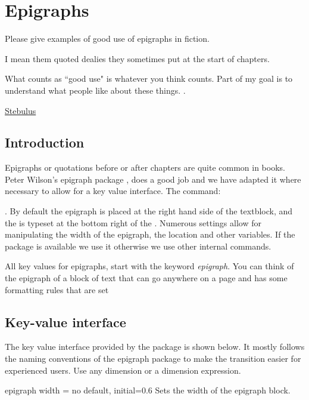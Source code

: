 

\chapter{Epigraphs}
\label{c:epigraphs}

\epigraph{Please give examples of good use of epigraphs in fiction.

I mean them quoted dealies they sometimes put at the start of chapters.

What counts as ``good use" is whatever you think counts. Part of my goal is to understand what people like about these things.
.}{\href{http://ask.metafilter.com/207423/Good-use-of-epigraphs-in-fiction}{Stebulus}}



\section{Introduction}

Epigraphs or quotations before or after chapters are quite common in books. Peter Wilson's epigraph package \citep{epigraph}, 
does a good job and we have adapted it where necessary to allow for a key value interface. The command:

. By default the epigraph is placed at the right
hand side of the textblock, and the  is typeset at the bottom right of the . 
Numerous settings allow for manipulating the width of the epigraph, the location and other 
variables. If the package is available we use it otherwise we use other internal commands.

All key values for epigraphs, start with the keyword \emph{epigraph}. You can think of the epigraph of a block of text that can go anywhere on a page and has some formatting rules that are set 

\section{Key-value interface}
The key value interface provided by the package is shown below. It mostly follows the 
naming conventions of the epigraph package to make the transition easier for experienced users. Use any dimension or a dimension expression.
\medskip

\begin{docKey}[phd]{epigraph width}{ =  }{no default, initial=0.6}
  Sets the width of the epigraph block. 
\end{docKey}



